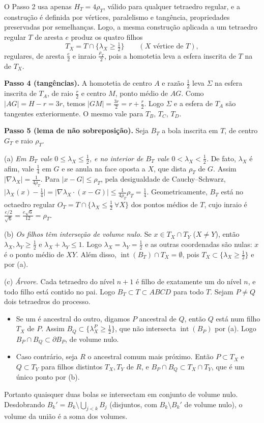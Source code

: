 \documentclass{article}%
\begin{document}
O Passo 2 usa apenas $H_T=4\rho_T$, válido para qualquer tetraedro regular, e a construção é definida por vértices, paralelismo e tangência, propriedades preservadas por semelhanças. Logo, a mesma construção aplicada a um tetraedro regular $T$ de aresta $e$ produz os quatro filhos
\[
T_X=T\cap\{\lambda_X\ge\tfrac12\}\qquad (X\text{ vértice de }T),
\]
regulares, de aresta $\frac e2$ e inraio $\frac{\rho_T}{2}$, pois a homotetia leva a esfera inscrita de $T$ na de $T_X$.

\textbf{Passo 4 (tangências).} A homotetia de centro $A$ e razão $\frac12$ leva $\Sigma$ na esfera inscrita de $T_A$, de raio $\frac r2$ e centro $M$, ponto médio de $AG$. Como $|AG|=H-r=3r$, temos $|GM|=\frac{3r}{2}=r+\frac r2$. Logo $\Sigma$ e a esfera de $T_A$ são tangentes exteriormente. O mesmo vale para $T_B$, $T_C$, $T_D$.

\textbf{Passo 5 (lema de não sobreposição).} Seja $B_T$ a bola inscrita em $T$, de centro $G_T$ e raio $\rho_T$.

(a) \emph{Em $B_T$ vale $0\le\lambda_X\le\frac12$, e no interior de $B_T$ vale $0<\lambda_X<\frac12$.} De fato, $\lambda_X$ é afim, vale $\frac14$ em $G$ e se anula na face oposta a $X$, que dista $\rho_T$ de $G$. Assim $|\nabla\lambda_X|=\frac{1}{4\rho_T}$. Para $|x-G|\le\rho_T$, pela desigualdade de Cauchy–Schwarz, $\big|\lambda_X(x)-\frac14\big|=\big|\nabla\lambda_X\cdot(x-G)\big|\le\frac{1}{4\rho_T}\rho_T=\frac14$. Geometricamente, $B_T$ está no octaedro regular $O_T=T\cap\{\lambda_X\le\frac12\ \forall X\}$ dos pontos médios de $T$, cujo inraio é $\frac{e/2}{\sqrt6}=\frac{e\sqrt6}{12}=\rho_T$.

(b) \emph{Os filhos têm interseção de volume nulo.} Se $x\in T_X\cap T_Y$ ($X\ne Y$), então $\lambda_X,\lambda_Y\ge\frac12$ e $\lambda_X+\lambda_Y\le1$. Logo $\lambda_X=\lambda_Y=\frac12$ e as outras coordenadas são nulas: $x$ é o ponto médio de $XY$. Além disso, $\operatorname{int}(B_T)\cap T_X=\emptyset$, pois $T_X\subset\{\lambda_X\ge\frac12\}$ e por (a).

(c) \emph{Árvore.} Cada tetraedro do nível $n+1$ é filho de exatamente um do nível $n$, e todo filho está contido no pai. Logo $B_T\subset T\subset ABCD$ para todo $T$. Sejam $P\ne Q$ dois tetraedros do processo.
\begin{itemize}
\item Se um é ancestral do outro, digamos $P$ ancestral de $Q$, então $Q$ está num filho $T_X$ de $P$. Assim $B_Q\subset\{\lambda^P_X\ge\frac12\}$, que não intersecta $\operatorname{int}(B_P)$ por (a). Logo $B_P\cap B_Q\subset\partial B_P$, de volume nulo.
\item Caso contrário, seja $R$ o ancestral comum mais próximo. Então $P\subset T_X$ e $Q\subset T_Y$ para filhos distintos $T_X,T_Y$ de $R$, e $B_P\cap B_Q\subset T_X\cap T_Y$, que é um único ponto por (b).
\end{itemize}
Portanto quaisquer duas bolas se intersectam em conjunto de volume nulo. Desdobrando $B_k'=B_k\setminus\bigcup_{j<k}B_j$ (disjuntos, com $B_k\setminus B_k'$ de volume nulo), o volume da união é a soma dos volumes.
\end{document}
